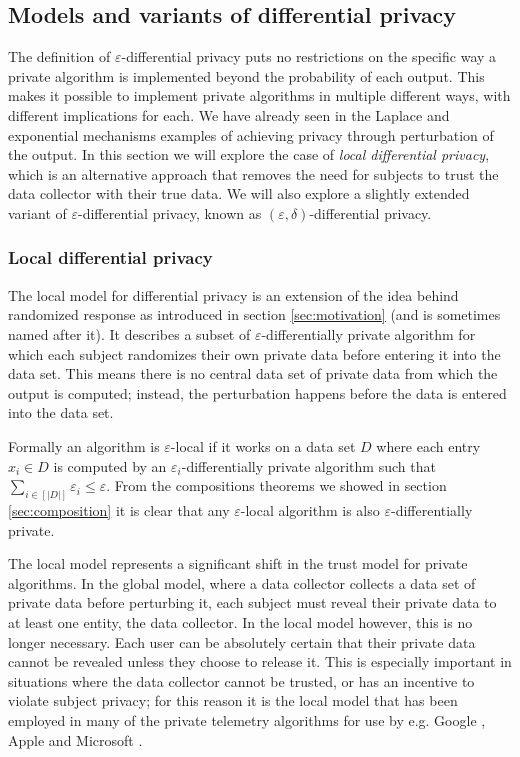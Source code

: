 \documentclass[12pt]{article}
\renewcommand{\epsilon}{\varepsilon}
\begin{document}
\subsection{Models and variants of differential privacy \label{sec:variants}}

The definition of $\epsilon$-differential privacy puts no restrictions on the specific way a private algorithm is implemented beyond the probability of each output. This makes it possible to implement private algorithms in multiple different ways, with different implications for each. We have already seen in the Laplace and exponential mechanisms examples of achieving privacy through perturbation of the output. In this section we will explore the case of \emph{local differential privacy}, which is an alternative approach that removes the need for subjects to trust the data collector with their true data. We will also explore a slightly extended variant of $\epsilon$-differential privacy, known as $(\epsilon,\delta)$-differential privacy.

\subsubsection{Local differential privacy}

The local model for differential privacy \cite{kasiv_localdiff} is an extension of the idea behind randomized response as introduced in section \ref{sec:motivation} (and is sometimes named after it). It describes a subset of $\epsilon$-differentially private algorithm for which each subject randomizes their own private data before entering it into the data set. This means there is no central data set of private data from which the output is computed; instead, the perturbation happens before the data is entered into the data set.

Formally an algorithm is $\epsilon$-local if it works on a data set $D$ where each entry $x_i \in D$ is computed by an $\epsilon_i$-differentially private algorithm such that $\sum_{i\in\left[|D|\right]} \epsilon_i \leq \epsilon$. From the compositions theorems we showed in section \ref{sec:composition} it is clear that any $\epsilon$-local algorithm is also $\epsilon$-differentially private.

The local model represents a significant shift in the trust model for private algorithms. In the global model, where a data collector collects a data set of private data before perturbing it, each subject must reveal their private data to at least one entity, the data collector. In the local model however, this is no longer necessary. Each user can be absolutely certain that their private data cannot be revealed unless they choose to release it. This is especially important in situations where the data collector cannot be trusted, or has an incentive to violate subject privacy; for this reason it is the local model that has been employed in many of the private telemetry algorithms for use by e.g. Google \cite{google_rappor}, Apple \cite{apple_differential} and Microsoft \cite{microsoft_telemetry}.
\end{document}
